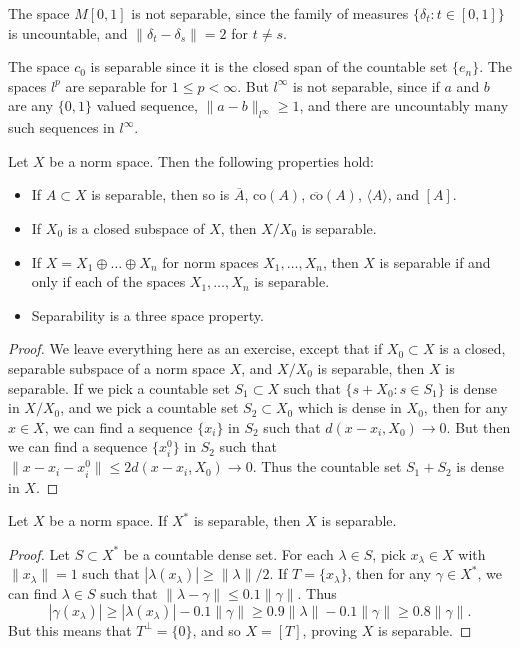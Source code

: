 \begin{example}
    The space $M[0,1]$ is not separable, since the family of measures $\{ \delta_t : t \in [0,1] \}$ is uncountable, and $\| \delta_t - \delta_s \| = 2$ for $t \neq s$.
\end{example}

\begin{example}
    The space $c_0$ is separable since it is the closed span of the countable set $\{ e_n \}$. The spaces $l^p$ are separable for $1 \leq p < \infty$. But $l^\infty$ is not separable, since if $a$ and $b$ are any $\{ 0, 1 \}$ valued sequence, $\| a - b \|_{l^\infty} \geq 1$, and there are uncountably many such sequences in $l^\infty$.
\end{example}

\begin{theorem}
    Let $X$ be a norm space. Then the following properties hold:
    \begin{itemize}
        \item If $A \subset X$ is separable, then so is $\overline{A}$, $\text{co}(A)$, $\overline{\text{co}}(A)$, $\langle A \rangle$, and $[A]$.
        \item If $X_0$ is a closed subspace of $X$, then $X/X_0$ is separable.
        \item If $X = X_1 \oplus \dots \oplus X_n$ for norm spaces $X_1,\dots,X_n$, then $X$ is separable if and only if each of the spaces $X_1, \dots, X_n$ is separable.
        \item Separability is a three space property.
    \end{itemize}
\end{theorem}
\begin{proof}
    We leave everything here as an exercise, except that if $X_0 \subset X$ is a closed, separable subspace of a norm space $X$, and $X / X_0$ is separable, then $X$ is separable. If we pick a countable set $S_1 \subset X$ such that $\{ s + X_0 : s \in S_1 \}$ is dense in $X / X_0$, and we pick a countable set $S_2 \subset X_0$ which is dense in $X_0$, then for any $x \in X$, we can find a sequence $\{ x_i \}$ in $S_2$ such that $d(x - x_i, X_0) \to 0$. But then we can find a sequence $\{ x_i^0 \}$ in $S_2$ such that $\| x - x_i - x_i^0 \| \leq 2 d(x - x_i,X_0) \to 0$. Thus the countable set $S_1 + S_2$ is dense in $X$.
\end{proof}

\begin{theorem}
    Let $X$ be a norm space. If $X^*$ is separable, then $X$ is separable.
\end{theorem}
\begin{proof}
    Let $S \subset X^*$ be a countable dense set. For each $\lambda \in S$, pick $x_\lambda \in X$ with $\| x_\lambda \| = 1$ such that $|\lambda(x_\lambda)| \geq \| \lambda \| / 2$. If $T = \{ x_\lambda \}$, then for any $\gamma \in X^*$, we can find $\lambda \in S$ such that $\| \lambda - \gamma \| \leq 0.1 \| \gamma \|$. Thus
    \[ |\gamma(x_\lambda)| \geq |\lambda(x_\lambda)| - 0.1 \| \gamma \| \geq 0.9 \| \lambda \| - 0.1 \| \gamma \| \geq 0.8 \| \gamma \|. \]
    But this means that $T^\perp = \{ 0 \}$, and so $X = [T]$, proving $X$ is separable.
\end{proof}

